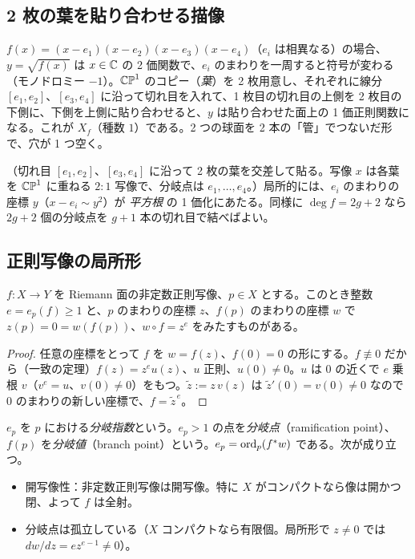 \subsection*{2 枚の葉を貼り合わせる描像}
$f(x)=(x-e_1)(x-e_2)(x-e_3)(x-e_4)$（$e_i$ は相異なる）の場合、$y=\sqrt{f(x)}$ は $x\in\mathbb C$ の 2 価関数で、$e_i$ のまわりを一周すると符号が変わる（モノドロミー $-1$）。$\mathbb{CP}^1$ のコピー（\emph{葉}）を 2 枚用意し、それぞれに線分 $[e_1,e_2]$、$[e_3,e_4]$ に沿って切れ目を入れて、1 枚目の切れ目の上側を 2 枚目の下側に、下側を上側に貼り合わせると、$y$ は貼り合わせた面上の 1 価正則関数になる。これが $X_f$（種数 $1$）である。2 つの球面を 2 本の「管」でつないだ形で、穴が 1 つ空く。
\begin{center}
\end{center}
（切れ目 $[e_1,e_2]$、$[e_3,e_4]$ に沿って 2 枚の葉を交差して貼る。写像 $x$ は各葉を $\mathbb{CP}^1$ に重ねる $2:1$ 写像で、分岐点は $e_1,\dots,e_4$。）局所的には、$e_i$ のまわりの座標 $y$（$x-e_i\sim y^2$）が \emph{平方根} の 1 価化にあたる。同様に $\deg f=2g+2$ なら $2g+2$ 個の分岐点を $g+1$ 本の切れ目で結べばよい。

\subsection{正則写像の局所形}
\begin{thm}[局所正規形]\label{thm:localform}
$f:X\to Y$ を Riemann 面の非定数正則写像、$p\in X$ とする。このとき整数 $e=e_p(f)\ge1$ と、$p$ のまわりの座標 $z$、$f(p)$ のまわりの座標 $w$ で $z(p)=0=w(f(p))$、$w\circ f=z^e$ をみたすものがある。
\end{thm}
\begin{proof}
任意の座標をとって $f$ を $w=f(z)$、$f(0)=0$ の形にする。$f\not\equiv0$ だから（一致の定理）$f(z)=z^e u(z)$、$u$ 正則、$u(0)\neq0$。$u$ は $0$ の近くで $e$ 乗根 $v$（$v^e=u$、$v(0)\ne0$）をもつ。$\tilde z:=z\,v(z)$ は $\tilde z'(0)=v(0)\ne0$ なので $0$ のまわりの新しい座標で、$f=\tilde z^{\,e}$。 
\end{proof}
$e_p$ を $p$ における\emph{分岐指数}という。$e_p>1$ の点を\emph{分岐点}（ramification point）、$f(p)$ を\emph{分岐値}（branch point）という。$e_p=\operatorname{ord}_p(f^*w)$ である。次が成り立つ。
\begin{itemize}
\item 開写像性：非定数正則写像は開写像。特に $X$ がコンパクトなら像は開かつ閉、よって $f$ は全射。
\item 分岐点は孤立している（$X$ コンパクトなら有限個。局所形で $z\ne0$ では $dw/dz=ez^{e-1}\ne0$）。
\end{itemize}

